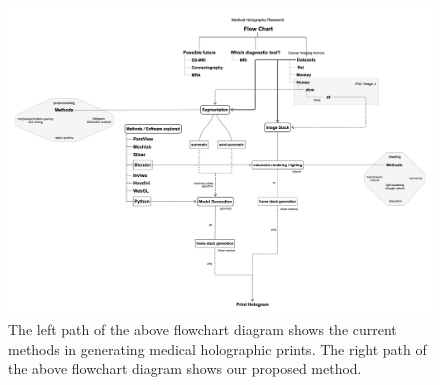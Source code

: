 \begin{figure}[tb]
 \centering %
 \includegraphics[width=\columnwidth]{pictures/detailedFlowChart.png}
 \caption{The left path of the above flowchart diagram shows the current methods in generating medical holographic prints. The right path of the above flowchart diagram shows our proposed method.} 
 \label{fig:flowChart}
\end{figure}

